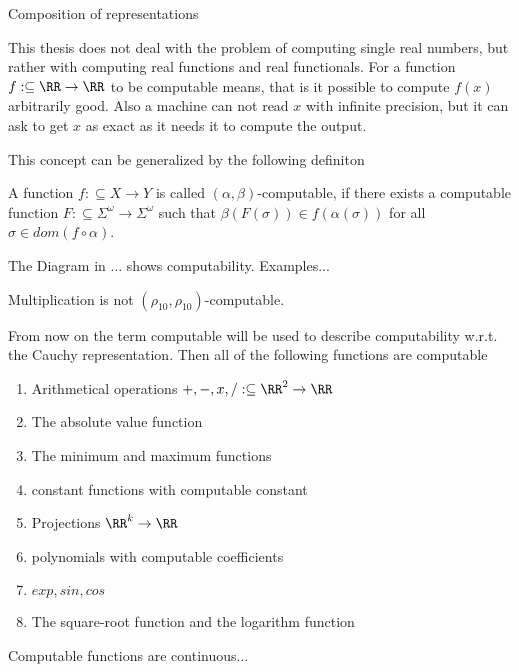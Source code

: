 \begin{definition}
\begin{definition}\label{def:representation_composition}
Composition of representations
\end{definition}
This thesis does not deal with the problem of computing single real numbers, but rather with computing real functions and real functionals.
For a function $f:\subseteq \RR \to \RR$ to be computable means, that is it possible to compute $f(x)$ arbitrarily good. 
Also a machine can not read $x$ with infinite precision, but it can ask to get $x$ as exact as it needs it to compute the output.
\begin{definition}\label{def:computability_oracle_tm}
\end{definition}
This concept can be generalized by the following definiton  
\begin{definition}\label{def:computability_function_representation}
	A function $f: \subseteq X \to Y$ is called \textbf{$(\alpha, \beta)$}-computable, 
	if there exists a computable function $F:\subseteq \Sigma^\omega \to \Sigma^\omega$ such that 
	$\beta(F(\sigma)) \in f(\alpha(\sigma))$ for all $\sigma \in dom(f \circ \alpha) $.  
\end{definition}
The Diagram in ... shows computability.
Examples...
\begin{theorem}
Multiplication is not $(\rho_{10}, \rho_{10})$-computable.
\end{theorem}
From now on the term computable will be used to describe computability w.r.t. the Cauchy representation.
Then all of the following functions are computable
\begin{enumerate}
\item Arithmetical operations $+,-,x,/ : \subseteq \RR^2 \to \RR$
\item The absolute value function
\item The minimum and maximum functions
\item constant functions with computable constant
\item Projections $\RR^k \to \RR$ 
\item polynomials with computable coefficients
\item $exp, sin, cos$
\item The square-root function and the logarithm function
\end{enumerate}
\begin{theorem}
	Computable functions are continuous...
\end{theorem}


\end{definition}
